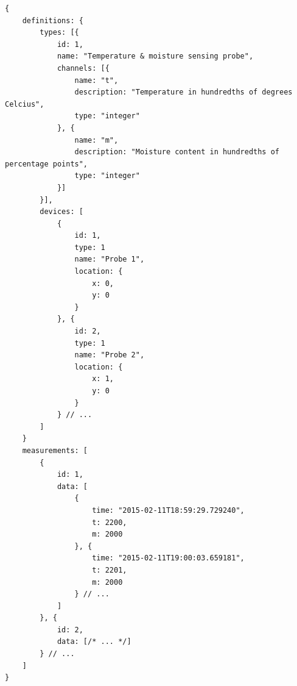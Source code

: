 \documentclass{article}
\begin{document}
\begin{verbatim}
{
    definitions: {
        types: [{
            id: 1,
            name: "Temperature & moisture sensing probe",
            channels: [{
                name: "t",
                description: "Temperature in hundredths of degrees Celcius",
                type: "integer"
            }, {
                name: "m",
                description: "Moisture content in hundredths of percentage points",
                type: "integer"
            }]
        }],
        devices: [
            {
                id: 1,
                type: 1
                name: "Probe 1",
                location: {
                    x: 0,
                    y: 0
                }
            }, {
                id: 2,
                type: 1
                name: "Probe 2",
                location: {
                    x: 1,
                    y: 0
                }
            } // ...
        ]
    }
    measurements: [
        {
            id: 1,    
            data: [
                {
                    time: "2015-02-11T18:59:29.729240",
                    t: 2200,
                    m: 2000
                }, {
                    time: "2015-02-11T19:00:03.659181",
                    t: 2201,
                    m: 2000
                } // ...
            ]
        }, {
            id: 2,
            data: [/* ... */]
        } // ...
    ]
}
\end{verbatim}
\end{document}
